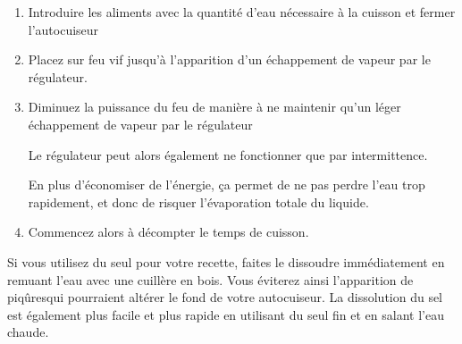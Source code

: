 \documentclass[a4paper,twoside]{report}
\begin{document}
\begin{enumerate}
\item Introduire les aliments avec la quantité d'eau nécessaire à la cuisson et fermer l'autocuiseur
\item Placez sur feu vif jusqu'à l'apparition d'un échappement de vapeur par le régulateur.
\item Diminuez la puissance du feu de manière à ne maintenir qu'un léger échappement de vapeur par le régulateur 
\begin{remarque}
Le régulateur peut alors également ne fonctionner que par intermittence.

En plus d'économiser de l'énergie, ça permet de ne pas perdre l'eau trop rapidement, et donc de risquer l'évaporation totale du liquide.
\end{remarque}
\item Commencez alors à décompter le temps de cuisson.
\end{enumerate}

\begin{remarque}
Si vous utilisez du seul pour votre recette, faites le dissoudre immédiatement en remuant l'eau avec une cuillère en bois. Vous éviterez ainsi l'apparition de \og piqûres\fg qui pourraient altérer le fond de votre autocuiseur. La dissolution du sel est également plus facile et plus rapide en utilisant du seul fin et en salant l'eau chaude.
\end{remarque}
\end{document}
